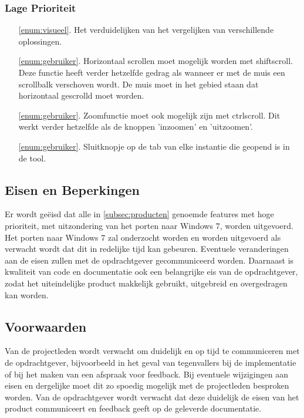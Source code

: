 \subsubsection*{Lage Prioriteit}
\begin{itemize}
	\item[\ref{enum:visueel}.] Het verduidelijken van het vergelijken van verschillende oplossingen.
	\item[\ref{enum:gebruiker}.] Horizontaal scrollen moet mogelijk worden met shift\plus scroll. Deze functie heeft verder hetzelfde gedrag als wanneer er met de muis een scrollbalk verschoven wordt. De muis moet in het gebied staan dat horizontaal gescrolld moet worden. 
	\item[\ref{enum:gebruiker}.] Zoomfunctie moet ook mogelijk zijn met ctrl\plus scroll. Dit werkt verder hetzelfde als de knoppen 'inzoomen' en 'uitzoomen'.
	\item[\ref{enum:gebruiker}.] Sluitknopje op de tab van elke instantie die geopend is in de tool.
\end{itemize}

\subsection{Eisen en Beperkingen}
Er wordt ge\"eisd dat alle in \ref{subsec:producten} genoemde features met hoge prioriteit, met uitzondering van het porten naar Windows 7, worden uitgevoerd. Het porten naar Windows 7 zal onderzocht worden en worden uitgevoerd als verwacht wordt dat dit in redelijke tijd kan gebeuren. Eventuele veranderingen aan de eisen zullen met de opdrachtgever gecommuniceerd worden. Daarnaast is kwaliteit van code en documentatie ook een belangrijke eis van de opdrachtgever, zodat het uiteindelijke product makkelijk gebruikt, uitgebreid en overgedragen kan worden.

\subsection{Voorwaarden}
Van de projectleden wordt verwacht om duidelijk en op tijd te communiceren met de opdrachtgever, bijvoorbeeld in het geval van tegenvallers bij de implementatie of bij het maken van een afspraak voor feedback. Bij eventuele wijzigingen aan eisen en dergelijke moet dit zo spoedig mogelijk met de projectleden besproken worden. Van de opdrachtgever wordt verwacht dat deze duidelijk de eisen van het product communiceert en feedback geeft op de geleverde documentatie.
